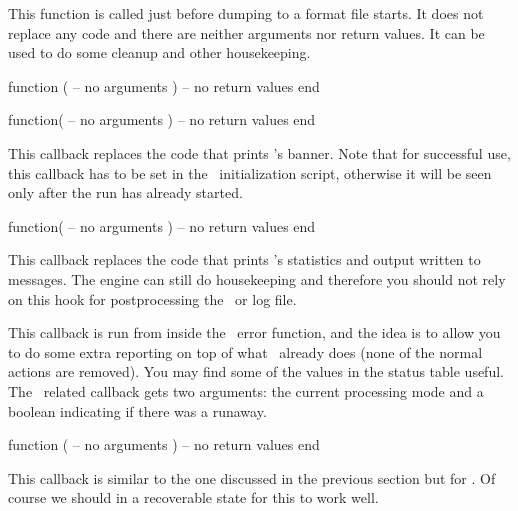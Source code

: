 \stopsubsection

\startsubsection[title=pre_dump]

This function is called just before dumping to a format file starts. It does not
replace any code and there are neither arguments nor return values. It can be used to do some
cleanup and other housekeeping.

\starttyping[option=LUA]
function (
    -- no arguments
)
    -- no return values
end
\stoptyping

\stopsubsection

\startsubsection[title=start_run]

\starttyping[option=LUA]
function(
    -- no arguments
)
    -- no return values
end
\stoptyping

This callback replaces the code that prints \LUATEX's banner. Note that for
successful use, this callback has to be set in the \LUA\ initialization script,
otherwise it will be seen only after the run has already started.

\stopsubsection

\startsubsection[title=stop_run]

\starttyping[option=LUA]
function(
    -- no arguments
)
    -- no return values
end
\stoptyping

This callback replaces the code that prints \LUATEX's statistics and \quote
{output written to} messages. The engine can still do housekeeping and therefore
you should not rely on this hook for postprocessing the \PDF\ or log file.

\stopsubsection

\startsubsection[title=intercept_tex_error]

This callback is run from inside the \TEX\ error function, and the idea is to
allow you to do some extra reporting on top of what \TEX\ already does (none of
the normal actions are removed). You may find some of the values in the \type
{status} table useful. The \TEX\ related callback gets two arguments: the current
processing mode and a boolean indicating if there was a runaway.


\starttyping[option=LUA]
function (
    -- no arguments
)
    -- no return values
end
\stoptyping

\stopsubsection

\startsubsection[title=intercept_lua_error]

This callback is similar to the one discussed in the previous section but for
\LUA. Of course we should in a recoverable state for this to work well.

